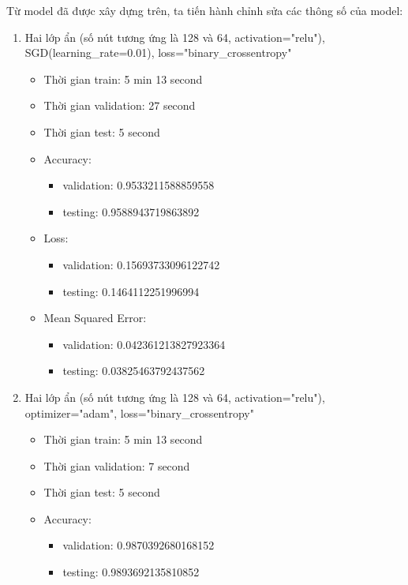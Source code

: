 \documentclass{article}
\begin{document}
Từ model đã được xây dựng trên, ta tiến hành chỉnh sửa các thông số của model:
\begin{enumerate}
	\item Hai lớp ẩn (số nút tương ứng là 128 và 64, activation="relu"), SGD(learning\_rate=0.01), loss="binary\_crossentropy"

	      \begin{itemize}
		      \item Thời gian train: 5 min 13 second
		      \item Thời gian validation: 27 second
		      \item Thời gian test: 5 second
		      \item Accuracy:
		            \begin{itemize}
			            \item validation: 0.9533211588859558
			            \item testing: 0.9588943719863892
		            \end{itemize}
		      \item Loss:
		            \begin{itemize}
			            \item validation: 0.15693733096122742
			            \item testing: 0.1464112251996994
		            \end{itemize}
		      \item Mean Squared Error:
		            \begin{itemize}
			            \item validation: 0.042361213827923364
			            \item testing: 0.03825463792437562
		            \end{itemize}
	      \end{itemize}
	\item Hai lớp ẩn (số nút tương ứng là 128 và 64, activation="relu"), optimizer="adam", loss="binary\_crossentropy"
	      \begin{itemize}
		      \item Thời gian train: 5 min 13 second
		      \item Thời gian validation: 7 second
		      \item Thời gian test: 5 second
		      \item Accuracy:
		            \begin{itemize}
			            \item validation: 0.9870392680168152
			            \item testing: 0.9893692135810852

\end{itemize}
\end{itemize}
\end{enumerate}
\end{document}

